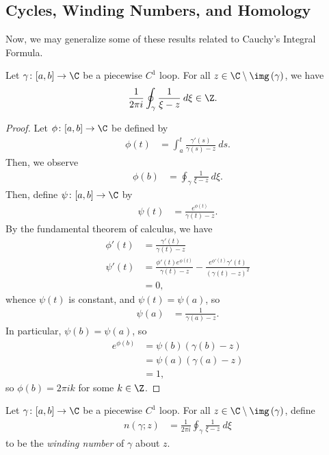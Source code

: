 \documentclass[10pt]{mypackage}
\begin{document}
\subsection{Cycles, Winding Numbers, and Homology}%
Now, we may generalize some of these results related to Cauchy's Integral Formula.
\begin{proposition}
  Let $\gamma\colon [a,b]\rightarrow \C$ be a piecewise $C^{1}$ loop. For all $z\in \C\setminus \img\left( \gamma \right)$, we have
  \begin{align*}
    \frac{1}{2\pi i} \oint_{\gamma}^{} \frac{1}{\xi-z}\:d\xi &\in \Z.
  \end{align*}
\end{proposition}
\begin{proof}
  Let $\phi\colon [a,b]\rightarrow \C$ be defined by
  \begin{align*}
    \phi(t) &= \int_{a}^{t} \frac{\gamma'(s)}{\gamma(s)-z}\:ds.
  \end{align*}
  Then, we observe
  \begin{align*}
    \phi(b) &= \oint_{\gamma}^{} \frac{1}{\xi - z}\:d\xi.
  \end{align*}
  Then, define $\psi\colon [a,b]\rightarrow \C$ by
  \begin{align*}
    \psi(t) &= \frac{e^{\phi(t)}}{\gamma(t)-z}.
  \end{align*}
  By the fundamental theorem of calculus, we have
  \begin{align*}
    \phi'(t) &= \frac{\gamma'(t)}{\gamma(t)-z}\\
  \psi'(t) &= \frac{\phi'(t)e^{\phi(t)}}{\gamma(t)-z} - \frac{e^{\phi'(t)}\gamma'(t)}{\left( \gamma(t)-z \right)^2}\\
           &= 0,
  \end{align*}
  whence $\psi(t)$ is constant, and $\psi(t) = \psi(a)$, so
  \begin{align*}
    \psi(a) &= \frac{1}{\gamma(a) - z}.
  \end{align*}
  In particular, $\psi(b) = \psi(a)$, so
  \begin{align*}
    e^{\phi(b)} &= \psi(b)\left( \gamma(b)-z \right)\\
                &= \psi(a)\left( \gamma(a)-z \right)\\
                &= 1,
  \end{align*}
  so $\phi(b) = 2\pi i k$ for some $k\in \Z$.
\end{proof}
\begin{definition}
  Let $\gamma\colon [a,b]\rightarrow \C$ be a piecewise $C^{1}$ loop. For all $z\in \C\setminus\img\left( \gamma \right)$, define
  \begin{align*}
    n\left( \gamma;z \right) &= \frac{1}{2\pi i} \oint_{\gamma}^{} \frac{1}{\xi - z}\:d\xi
  \end{align*}
   to be the \textit{winding number} of $\gamma$ about $z$.
\end{definition}
\end{document}
